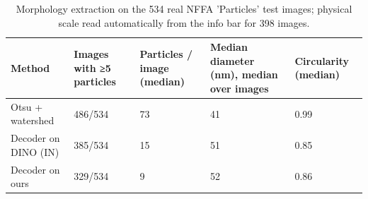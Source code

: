 \begin{table}
\caption{Morphology extraction on the 534 real NFFA 'Particles' test images; physical scale read automatically from the info bar for 398 images.}
\label{tab:t10_morph_real}
\begin{tabular}{lllll}
\toprule
Method & Images with ≥5 particles & Particles / image (median) & Median diameter (nm), median over images & Circularity (median) \\
\midrule
Otsu + watershed & 486/534 & 73 & 41 & 0.99 \\
Decoder on DINO (IN) & 385/534 & 15 & 51 & 0.85 \\
Decoder on ours & 329/534 & 9 & 52 & 0.86 \\
\bottomrule
\end{tabular}
\end{table}
